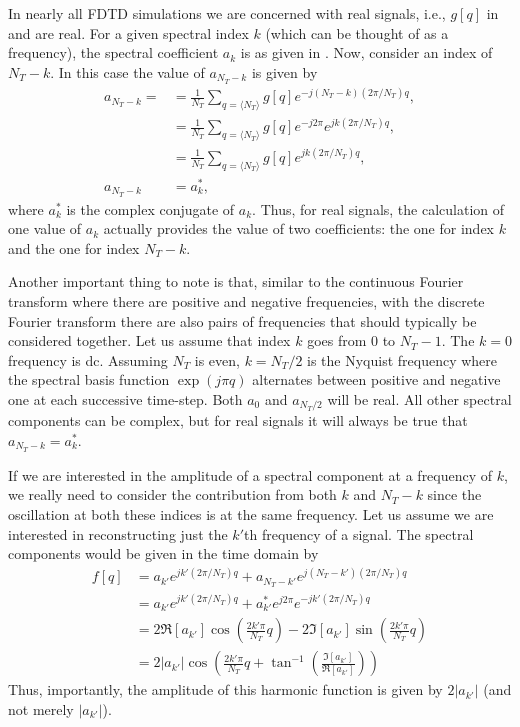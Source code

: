 In nearly all FDTD simulations we are concerned with real signals,
i.e., $g[q]$ in  and  are real.  For
a given spectral index $k$ (which can be thought of as a frequency),
the spectral coefficient $a_k$ is as given in .  Now,
consider an index of $N_T - k$.  In this case the value of $a_{N_T -
  k}$ is given by
\begin{align}
  a_{N_T - k} = &= \frac{1}{N_T}
    \sum_{q=\langle N_T\rangle} g[q] e^{-j(N_T-k)(2\pi/N_T)q}, \nonumber \\
  &= \frac{1}{N_T}
    \sum_{q=\langle N_T\rangle} g[q] e^{-j2\pi}e^{jk(2\pi/N_T)q}, \nonumber \\
  &= \frac{1}{N_T}
    \sum_{q=\langle N_T\rangle} g[q] e^{jk(2\pi/N_T)q}, \nonumber \\
a_{N_T - k} &= a_k^*,
\end{align}
where $a_k^*$ is the complex conjugate of $a_k$.  Thus, for real
signals, the calculation of one value of $a_k$ actually provides the
value of two coefficients: the one for index $k$ and the one for index
$N_T-k$.

Another important thing to note is that, similar to the continuous
Fourier transform where there are positive and negative frequencies,
with the discrete Fourier transform there are also pairs of
frequencies that should typically be considered together.  Let us
assume that index $k$ goes from $0$ to $N_T-1$.  The $k=0$ frequency
is dc.  Assuming $N_T$ is even, $k=N_T/2$ is the Nyquist frequency where
the spectral basis function $\exp(j\pi q)$ alternates between positive
and negative one at each successive time-step.  Both $a_0$ and
$a_{N_T/2}$ will be real.  All other spectral components can be
complex, but for real signals it will always be true that $a_{N_T-k} =
a_k^*$.

If we are interested in the amplitude of a spectral component at a
frequency of $k$, we really need to consider the contribution from
both $k$ and $N_T-k$ since the oscillation at both these indices is at
the same frequency.  Let us assume we are interested in reconstructing
just the $k'$th frequency of a signal.  The spectral components would
be given in the time domain by
\begin{align}
  f[q] &= a_{k'} e^{jk'(2\pi/N_T)q} + a_{N_T-k'} e^{j(N_T-k')(2\pi/N_T)q} \nonumber\\
       &= a_{k'} e^{jk'(2\pi/N_T)q} + a_{k'}^* e^{j2\pi} e^{-jk'(2\pi/N_T)q} \nonumber\\
       &= 2 \Re[a_{k'}]\cos\!\left(\frac{2k'\pi}{N_T}q\right) 
        - 2 \Im[a_{k'}]\sin\!\left(\frac{2k'\pi}{N_T}q\right) \nonumber\\
       &= 2 |a_{k'}| \cos\!\left(\frac{2k'\pi}{N_T}q + 
          \tan^{-1}\!\left(\frac{\Im[a_{k'}]}{\Re[a_{k'}]}\right)\right) 
\end{align}
Thus, importantly, the amplitude of this harmonic function is given by
$2|a_{k'}|$ (and not merely $|a_{k'}|$).

